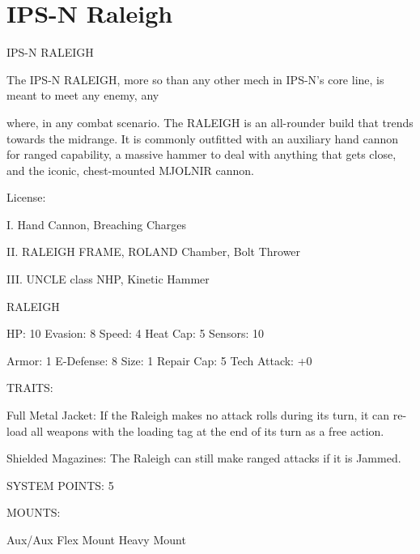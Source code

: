 \section{IPS-N Raleigh}
                                                             
                                              IPS-N RALEIGH  

The IPS-N RALEIGH, more so than any other mech in IPS-N’s core line, is meant to meet any enemy, any  

where, in any combat scenario. The RALEIGH is an all-rounder build that trends towards the midrange. It is  
commonly outfitted with an auxiliary hand cannon for ranged capability, a massive hammer to deal with  
anything that gets close, and the iconic, chest-mounted MJOLNIR cannon.  

                                                      License:
 
I. Hand Cannon, Breaching Charges
 
II. RALEIGH FRAME, ROLAND Chamber, Bolt Thrower
 
III. UNCLE class NHP, Kinetic Hammer
 

                                                                                                                  


                                                    RALEIGH 

  HP: 10          Evasion: 8                              Speed: 4            Heat Cap: 5         Sensors: 10 

  Armor: 1        E-Defense: 8                            Size: 1             Repair Cap: 5       Tech Attack:  
                                                                                                  +0 

                                                      TRAITS: 

  Full Metal Jacket: If the Raleigh makes no attack rolls during its turn, it can re-load all weapons with  
  the loading tag at the end of its turn as a free action.
 
  Shielded Magazines: The Raleigh can still make ranged attacks if it is Jammed. 

                                               SYSTEM POINTS: 5 

                                                     MOUNTS: 

  Aux/Aux                             Flex Mount                              Heavy Mount 

